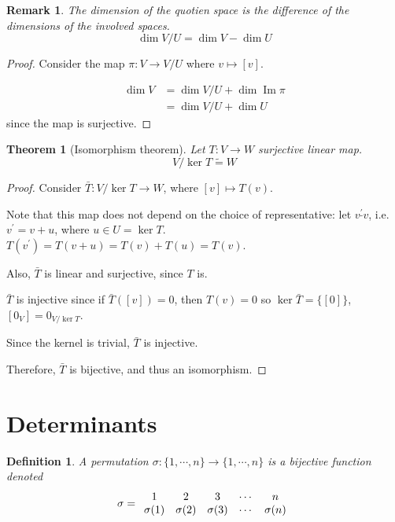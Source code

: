 \documentclass{article}
\newtheorem{definition}{Definition}
\newtheorem{theorem}{Theorem}
\newtheorem{remark}{Remark}
\newcommand{\iso}{\tilde{=}}
\DeclareMathOperator{\im}{Im}
\begin{document}
\begin{remark}
    The dimension of the quotien space is the difference of the dimensions of
    the involved spaces.
    $$
        \dim{V/U} = \dim V - \dim U
    $$
\end{remark}

\begin{proof}
    Consider the map $\pi : V \to V/U$ where $v \mapsto [v]$.

    \begin{align*}
        \dim V &= \dim{V/U} + \dim {\im \pi} \\
               &= \dim{V/U} + \dim U
    \end{align*}
    since the map is surjective.
\end{proof}

\begin{theorem}[Isomorphism theorem]
    Let $T : V \to W$ surjective linear map.
    $$V/\ker{T} \iso W$$
\end{theorem}

\begin{proof}
    Consider $\bar T : V/\ker{T} \to W$, where $[v] \mapsto T(v)$.

    Note that this map does not depend on the choice of representative: let
    $v^\prime \tilde{} v$, i.e. $v^\prime = v + u$, where $u \in U = \ker{T}$.
    $T(v^\prime) = T(v + u) = T(v) + T(u) = T(v)$.

    Also, $\bar T$ is linear and surjective, since $T$ is.

    $\bar T$ is injective since if $\bar T([v]) = 0$, then $T(v) = 0$ so
    $\ker{\bar T} = \{[0]\}$, $[0_V] = 0_{V/\ker{T}}$.

    Since the kernel is trivial, $\bar T$ is injective.

    Therefore, $\bar T$ is bijective, and thus an isomorphism.
\end{proof}

\section{Determinants}

\begin{definition}
    A \emph{permutation} $\sigma : \{1,\cdots,n\} \to \{1,\cdots,n\}$ is a
    bijective function denoted
    $$
        \sigma =
        \begin{array}{c c c c c}
            1 & 2 & 3 & \cdots & n \\
            \sigma(1) & \sigma(2) & \sigma(3) & \cdots & \sigma(n)
        \end{array}
    $$
\end{definition}
\end{document}
